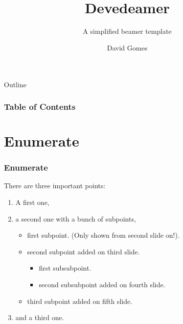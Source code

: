 \documentclass[aspectratio=169]{beamer}
\title{Devedeamer}
\subtitle{A simplified beamer template}
\author{David Gomes}
\institute{UFPR}
\begin{document}
\begin{frame}    
\titlepage
\end{frame}

\begin{frame}{Outline}
\frametitle{Table of Contents}
\tableofcontents[hideallsubsections]
\end{frame}

\section{Enumerate}
\begin{frame}
\frametitle{Enumerate}

There are three important points:
\begin{enumerate}
    \item<1-> A first one,
    \item<2-> a second one with a bunch of subpoints,
        \begin{itemize}
            \item first subpoint. (Only shown from second slide on!).
            \item<3-> second subpoint added on third slide.
                \begin{itemize}
                    \item first subsubpoint.
                    \item<4-> second subsubpoint added on fourth slide.
                \end{itemize}
            \item<5-> third subpoint added on fifth slide.
        \end{itemize}
    \item<6-> and a third one.
\end{enumerate}

\end{frame}
\end{document}
